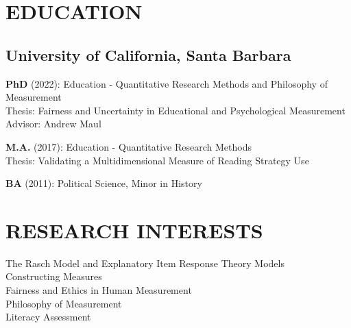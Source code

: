 \documentclass[12pt, oneside,]{memoir}
\begin{document}
\thispagestyle{headers}

\hypertarget{education}{%
\section{EDUCATION}\label{education}}
\hypertarget{university-of-california-santa-barbara}{%
\subsection{University of California, Santa
Barbara}\label{university-of-california-santa-barbara}}
\noindent\textbf{PhD} (2022): Education - Quantitative Research Methods and
Philosophy of Measurement\\
\hspace*{0.333em}\hspace*{0.333em}Thesis: Fairness and Uncertainty in
Educational and Psychological Measurement\\
\hspace*{0.333em}\hspace*{0.333em}Advisor: Andrew Maul

\noindent \textbf{M.A.} (2017): Education - Quantitative Research Methods\\
\hspace*{0.333em}\hspace*{0.333em}Thesis: Validating a Multidimensional
Measure of Reading Strategy Use
\vspace{2mm}

\noindent \textbf{BA} (2011): Political Science, Minor in History
\vspace{4mm}

\hypertarget{research-interests}{%
\section{RESEARCH INTERESTS}\label{research-interests}}
\noindent\hspace*{0.333em} The Rasch Model and Explanatory Item Response Theory Models\\
\hspace*{0.333em} Constructing Measures\\
\hspace*{0.333em} Fairness and Ethics in Human Measurement\\
\hspace*{0.333em} Philosophy of Measurement\\
\hspace*{0.333em} Literacy Assessment\\
\vspace{2mm}
\end{document}
